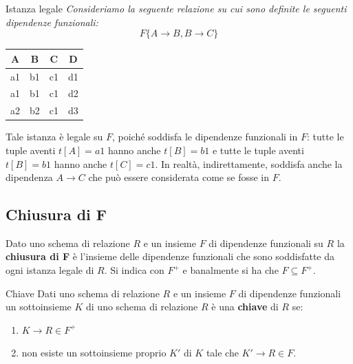 \begin{Example}{Istanza legale}{}
    \textit{Consideriamo la seguente relazione su cui sono definite le seguenti dipendenze funzionali:}
    \begin{equation*}
        F\{A\to B, B\to C\}
    \end{equation*}
    \begin{center}
        \begin{tabular}{|c|c|c|c|}
            \hline
            \textbf{A} & \textbf{B} & \textbf{C} & \textbf{D}\\\hline
            a1 & b1 & c1 & d1\\
            a1 & b1 & c1 & d2\\
            a2 & b2 & c1 & d3\\\hline
        \end{tabular}
    \end{center}
    Tale istanza è legale su $F$, poiché soddisfa le dipendenze funzionali in $F$: tutte le tuple aventi $t[A] = a1$ hanno anche $t[B] = b1$ e tutte le tuple aventi $t[B] = b1$ hanno anche $t[C] = c1$. In realtà, indirettamente, soddisfa anche la dipendenza $A\to C$ che può essere considerata come se fosse in $F$.
\end{Example}

\subsection{Chiusura di F}
\begin{redbar}
    Dato uno schema di relazione $R$ e un insieme $F$ di dipendenze funzionali su $R$ la \textbf{chiusura di F} è l'insieme delle dipendenze funzionali che sono soddisfatte da ogni istanza legale di $R$. Si indica con $F^+$ e banalmente si ha che $F\subseteq F^+$.
\end{redbar}

\begin{Definition}{Chiave}{}
    Dati uno schema di relazione $R$ e un insieme $F$ di dipendenze funzionali un sottoinsieme $K$ di uno schema di relazione $R$ è una \textbf{chiave} di $R$ se: 
    \begin{enumerate}
        \item $K\to R \in F^+$
        \item non esiste un sottoinsieme proprio $K'$ di $K$ tale che $K'\to R \in F$.
    \end{enumerate}

\end{Definition}

